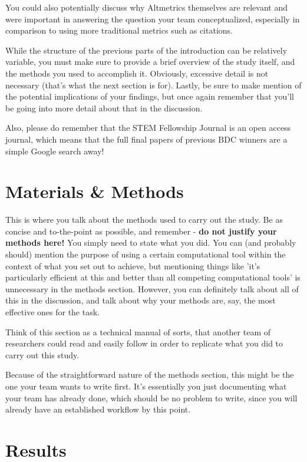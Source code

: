 \documentclass[10pt,twocolumn,letterpaper]{article}
\begin{document}
You could also potentially discuss why Altmetrics themselves are relevant and were important in answering the question your team conceptualized, especially in comparison to using more traditional metrics such as citations.

While the structure of the previous parts of the introduction can be relatively variable, you must make sure to provide a brief overview of the study itself, and the methods you used to accomplish it. Obviously, excessive detail is not necessary (that's what the next section is for). Lastly, be sure to make mention of the potential implications of your findings, but once again remember that you'll be going into more detail about that in the discussion.

Also, please do remember that the STEM Fellowship Journal is an open access journal, which means that the full final papers of previous BDC winners are a simple Google search away!

\section{Materials \& Methods}

This is where you talk about the methods used to carry out the study. Be as concise and to-the-point as possible, and remember - \textbf{do not justify your methods here!} You simply need to state what you did. You can (and probably should) mention the purpose of using a certain computational tool within the context of what you set out to achieve, but mentioning things like 'it's particularly efficient at this and better than all competing computational tools' is unnecessary in the methods section. However, you can definitely talk about all of this in the discussion, and talk about why your methods are, say, the most effective ones for the task.

Think of this section as a technical manual of sorts, that another team of researchers could read and easily follow in order to replicate what you did to carry out this study.

Because of the straightforward nature of the methods section, this might be the one your team wants to write first. It's essentially you just documenting what your team has already done, which should be no problem to write, since you will already have an established workflow by this point.

\section{Results}
\end{document}
